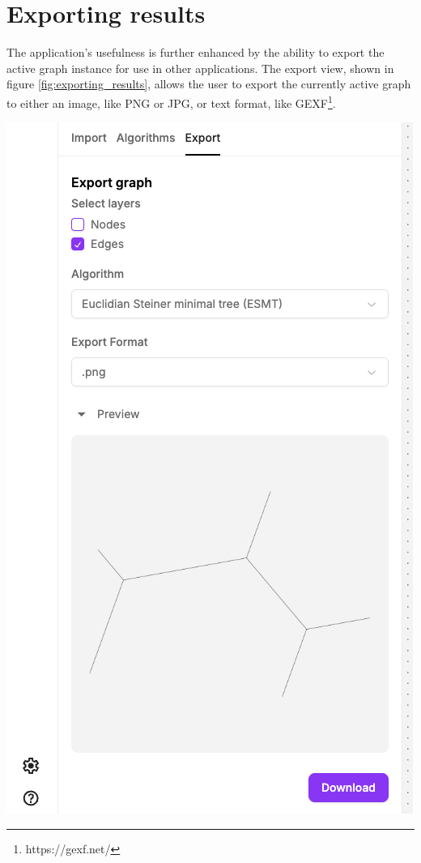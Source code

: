 \documentclass{l4proj}
\begin{document}
\section{Exporting results}
\label{sec:exporting_results}
The application's usefulness is further enhanced by the ability to export the active graph instance for use in other applications. The export view, shown in figure \ref{fig:exporting_results}, allows the user to export the currently active graph to either an image, like PNG or JPG, or text format, like GEXF\footnote{https://gexf.net/}.
\begin{wrapstuff}[r,width=0.4\textwidth,type=figure]
    \centering
    \begin{tcolorbox}[colframe=gray!20, colback=gray!5, boxrule=1pt, arc=0mm, boxsep=0pt, left=0pt, right=0pt, top=0pt, bottom=0pt]
        \includegraphics[width=\textwidth]{images/export_view.png}
    \end{tcolorbox}

    \label{fig:exporting_results}
\end{wrapstuff}
\end{document}
